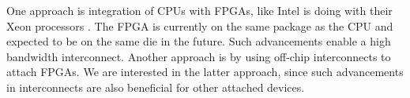 One approach is integration of CPUs with FPGAs, like Intel is doing with their Xeon processors \cite{gupta-xeon}. The FPGA is currently on the same package as the CPU and expected to be on the same die in the future. Such advancements enable a high bandwidth interconnect. Another approach is by using off-chip interconnects to attach FPGAs. We are interested in the latter approach, since such advancements in interconnects are also beneficial for other attached devices.


